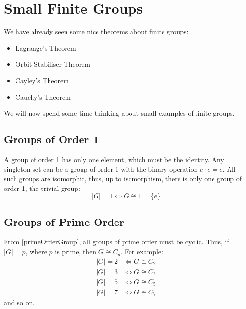 \documentclass[../main.tex]{subfiles}
\begin{document}
\chapter{Small Finite Groups}
We have already seen some nice theorems about finite groups:
\begin{itemize}
  \item Lagrange's Theorem
  \item Orbit-Stabiliser Theorem
  \item Cayley's Theorem
  \item Cauchy's Theorem
\end{itemize}
We will now spend some time thinking about small examples of finite groups.
\section{Groups of Order 1}
A group of order 1 has only one element, which must be the identity.
Any singleton set can be a group of order 1 with the binary operation $e \cdot e = e$.
All such groups are isomorphic, thus, up to isomorphism, there is only one group of order 1, the trivial group:
\[
  |G| = 1 \iff G \cong 1 = \{e\}
\]
\section{Groups of Prime Order}
From \cref{primeOrderGroup}, all groups of prime order must be cyclic.
Thus, if $|G| = p$, where $p$ is prime, then $G \cong C_p$.
For example:
\begin{align*}
  |G| = 2 &\iff G \cong C_2 \\
  |G| = 3 &\iff G \cong C_3 \\
  |G| = 5 &\iff G \cong C_5 \\
  |G| = 7 &\iff G \cong C_7
\end{align*}
and so on.
\end{document}

